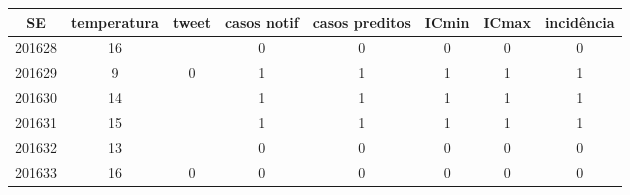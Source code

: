 \begin{tabular}{c|ccccccc}
  \hline
SE & temperatura & tweet & casos notif & casos preditos & ICmin & ICmax & incidência \\ 
  \hline
201628 & 16 &  & 0 & 0 & 0 & 0 & 0 \\ 
  201629 & 9 & 0 & 1 & 1 & 1 & 1 & 1 \\ 
  201630 & 14 &  & 1 & 1 & 1 & 1 & 1 \\ 
  201631 & 15 &  & 1 & 1 & 1 & 1 & 1 \\ 
  201632 & 13 &  & 0 & 0 & 0 & 0 & 0 \\ 
  201633 & 16 & 0 & 0 & 0 & 0 & 0 & 0 \\ 
   \hline
\end{tabular}
